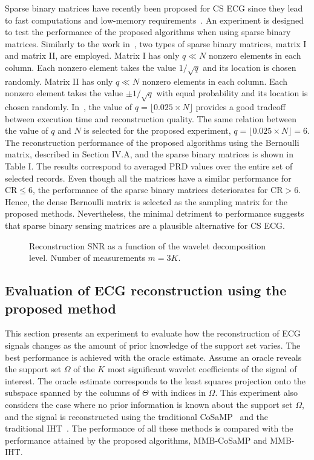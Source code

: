 \documentclass[journal]{IEEEtran}
\begin{document}
Sparse binary matrices have recently been proposed for CS ECG since they lead to fast computations and low-memory requirements~\cite{Mama11}. An experiment is designed to test the performance of the proposed algorithms when using sparse binary matrices. Similarly to the work in~\cite{Mama11}, two types of sparse binary matrices, matrix I and matrix II, are employed. Matrix I has only $q\ll N$ nonzero elements in each column. Each nonzero element takes the value $1/\sqrt{q}$ and its location is chosen randomly. Matrix II has only $q\ll N$ nonzero elements in each column. Each nonzero element takes the value $\pm1/\sqrt{q}$ with equal probability and its location is chosen randomly. In~\cite{Mama11}, the value of $q=\lfloor0.025\times N\rfloor$ provides a good tradeoff between execution time and reconstruction quality. The same relation between the value of $q$ and $N$ is selected for the proposed experiment, $q=\lfloor0.025\times N\rfloor=6$. The reconstruction performance of the proposed algorithms using the Bernoulli matrix, described in Section IV.A, and the sparse binary matrices is shown in Table I. The results correspond to averaged PRD values over the entire set of selected records. Even though all the matrices have a similar performance for $\text{CR}\leq6$, the performance of the sparse binary matrices deteriorates for $\text{CR}>6$. Hence, the dense Bernoulli matrix is selected as the sampling matrix for the proposed methods. Nevertheless, the minimal detriment to performance suggests that sparse binary sensing matrices are a plausible alternative for CS ECG.

\begin{figure}[t]
\caption{Reconstruction SNR as a function of the wavelet decomposition level. Number of measurements $m=3K$.} \label{fig:dl}
\end{figure}












\subsection{Evaluation of ECG reconstruction using the proposed method}
This section presents an experiment to evaluate how the reconstruction of ECG signals changes as the amount of prior knowledge of the support set varies. The best performance is achieved with the oracle estimate. Assume an oracle reveals the support set $\Omega$ of the $K$ most significant wavelet coefficients of the signal of interest. The oracle estimate corresponds to the least squares projection onto the subspace spanned by the columns of $\Theta$ with indices in $\Omega$. This experiment also considers the case where no prior information is known about the support set $\Omega$, and the signal is reconstructed using the traditional CoSaMP~\cite{Need08} and the traditional IHT~\cite{Blum09}. The performance of all these methods is compared with the performance attained by the proposed algorithms, MMB-CoSaMP and MMB-IHT.
\end{document}
